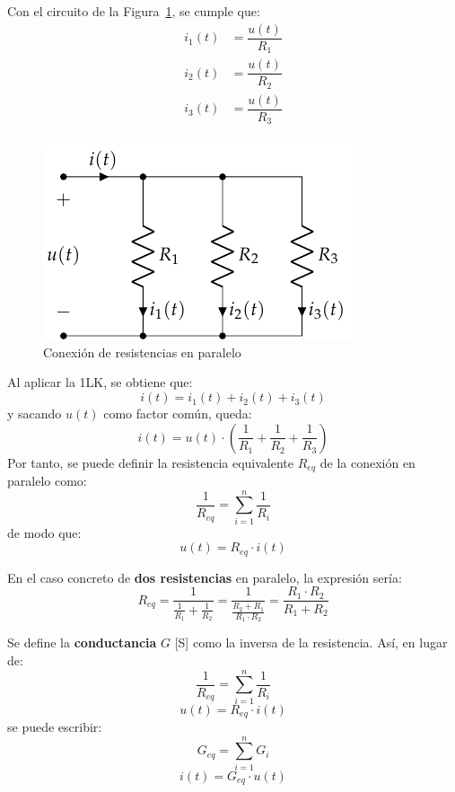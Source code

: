 \documentclass[11pt]{book} %
\begin{document}
			Con el circuito de la Figura~\ref{fig.resistencias-paralelo}, se cumple que:
		\begin{align*}
			i_1(t) &= \dfrac{u(t)}{R_1}\\
			i_2(t) &= \dfrac{u(t)}{R_2}\\
			i_3(t) &= \dfrac{u(t)}{R_3}\\
		\end{align*}
		\begin{figure}[tbp]
			\centering
			\includegraphics[width=0.35\linewidth]{../figs/AsociacionParalelo.pdf}
			\caption{Conexión de resistencias en paralelo}
			\label{fig.resistencias-paralelo}
		\end{figure}
		Al aplicar la 1LK, se obtiene que: 
		\begin{equation*}
			i(t) = i_1(t) + i_2(t) + i_3(t)
		\end{equation*}
		y sacando $u(t)$ como factor común, queda:
		\begin{equation*}
			i(t) = u(t) \cdot \left(\frac{1}{R_1} + \frac{1}{R_2} + \frac{1}{R_3}\right)
		\end{equation*}
		Por tanto, se puede definir la resistencia equivalente $R_{eq}$ de la conexión en paralelo como:
		\begin{equation}
			\boxed{\dfrac{1}{R_{eq}} = \sum_{i = 1}^n \dfrac{1}{R_i}}
		\end{equation}
		de modo que:
		\begin{equation*}
			u(t) = R_{eq} \cdot i(t)
		\end{equation*}
		
		\begin{remark}
			En el caso concreto de \textbf{dos resistencias} en paralelo, la expresión sería: 
			\begin{equation*}
				R_{eq}=\dfrac{1}{\frac{1}{R_1}+\frac{1}{R_2}}=\dfrac{1}{\frac{R_2+R_1}{R_1\cdot R_2}}=\dfrac{R_1\cdot R_2}{R_1+R_2}
			\end{equation*}
		\end{remark}
		
		Se define la \textbf{conductancia} $G$ [S] como la inversa de la resistencia. Así, en lugar de:
		\begin{equation*}
			\dfrac{1}{R_{eq}} = \sum_{i = 1}^n \dfrac{1}{R_i}
		\end{equation*}
		\begin{equation*}
			u(t) = R_{eq} \cdot i(t)
		\end{equation*}
		se puede escribir:
		\begin{equation}
			\boxed{G_{eq} = \sum_{i = 1}^n G_i}
		\end{equation}
		\begin{equation*}
			i(t) = G_{eq} \cdot u(t)
		\end{equation*}
		
\end{document}
